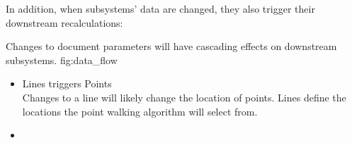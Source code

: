In addition, when subsystems' data are changed, they also trigger their downstream recalculations:

{Changes to document parameters will have cascading effects on downstream subsystems.}
{fig:data_flow}

\begin{itemize}
  \item Lines triggers Points \\
        Changes to a line will likely change the location of points.
        Lines define the locations the point walking algorithm will select from.

  \item
\end{itemize}

